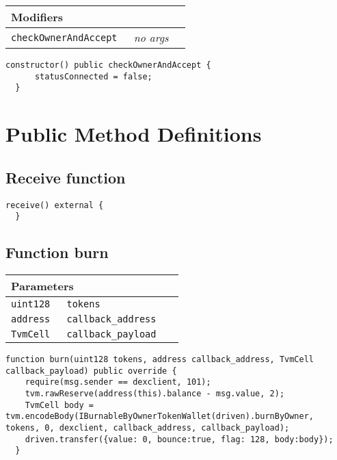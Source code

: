 \ifsoltables
\noindent\begin{tabular}{|l|l|p{5cm}|}\hline
\multicolumn{3}{|l|}{\bf Modifiers}\\\hline
\tt checkOwnerAndAccept & {\em no args} &\\\hline
\end{tabular}
\fi

\vspace{2cm}

\begin{lstlisting}[firstnumber=39]
  constructor() public checkOwnerAndAccept {
      statusConnected = false;
  }
\end{lstlisting}

\section{Public Method Definitions}


\subsection{Receive function}

\vspace{2cm}

\begin{lstlisting}[firstnumber=129]
  receive() external {
  }
\end{lstlisting}

\subsection{Function burn}


\ifsoltables
\noindent\begin{tabular}{|l|l|p{5cm}|}\hline
\multicolumn{3}{|l|}{\bf Parameters}\\\hline
\tt uint128 & \tt tokens &\\\hline
\tt address & \tt callback\_{}address &\\\hline
\tt TvmCell & \tt callback\_{}payload &\\\hline
\end{tabular}
\fi

\vspace{2cm}

\begin{lstlisting}[firstnumber=116]
  function burn(uint128 tokens, address callback_address, TvmCell callback_payload) public override {
    require(msg.sender == dexclient, 101);
    tvm.rawReserve(address(this).balance - msg.value, 2);
    TvmCell body = tvm.encodeBody(IBurnableByOwnerTokenWallet(driven).burnByOwner, tokens, 0, dexclient, callback_address, callback_payload);
    driven.transfer({value: 0, bounce:true, flag: 128, body:body});
  }
\end{lstlisting}

